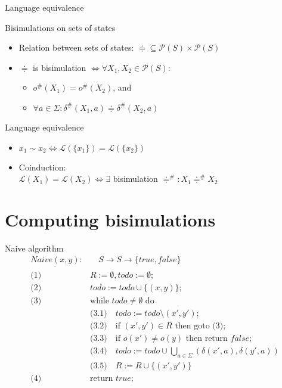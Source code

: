 \documentclass[compress]{beamer}
\begin{document}
\begin{frame}{Language equivalence}
  \begin{block}{Bisimulations on sets of states}
    \begin{itemize}
      \item Relation between sets of states: $\doteqdot \subseteq \mathcal{P}(S) \times \mathcal{P}(S)$
      \item $\doteqdot$ is bisimulation $\Leftrightarrow \forall X_1, X_2 \in \mathcal{P}(S): $
        \begin{itemize}
          \item $o^\#(X_1) = o^\#(X_2)$, and
          \item $\forall a \in \Sigma: \delta^\#(X_1, a) \doteqdot \delta^\#(X_2, a)$
        \end{itemize}
    \end{itemize}
  \end{block}

  \begin{block}{Language equivalence}
    \begin{itemize}
      \item $x_1 \sim x_2 \Leftrightarrow \mathcal{L}(\{x_1\}) = \mathcal{L}(\{x_2\})$
      \item Coinduction:\\
        $\mathcal{L}(X_1) = \mathcal{L}(X_2) \Leftrightarrow \exists$ bisimulation $\doteqdot^\#: X_1 \doteqdot^\# X_2$
    \end{itemize}
  \end{block}
\end{frame}

\section{Computing bisimulations}

\begin{frame}{Naive algorithm}
  \begin{align*}
    \underline{Naive(x, y)}: &\quad S \to S \to \{true, false\} \\
    \text{(1) } & R := \emptyset, todo := \emptyset;\\
    \text{(2) } & todo := todo \cup \{(x, y)\};\\
    \text{(3) } & \text{while } todo \neq \emptyset \text{ do}\\
      & \text{(3.1)}\quad todo := todo \setminus (x', y');\\
      & \text{(3.2)}\quad \text{if } (x', y') \in R \text{ then goto (3)};\\
      & \text{(3.3)}\quad \text{if } o(x') \neq o(y) \text{ then return } false;\\
      & \text{(3.4)}\quad todo := todo \cup \bigcup_{a \in \Sigma}{(\delta(x', a), \delta(y', a))} \\
      & \text{(3.5)}\quad R := R \cup \{(x', y')\} \\
    \text{(4) } & \text{return } true;\\
  \end{align*}
\end{frame}
\end{document}

